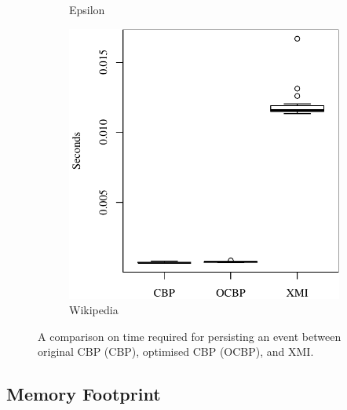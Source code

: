\documentclass{llncs}
\begin{document}
\begin{figure}[t]
\begin{subfigure}{0.325\textwidth}
            \caption{Epsilon}
            \label{fig:save_time_epsilon}
        \end{subfigure}
        \hfill
        \begin{subfigure}{0.325\textwidth}
            \centering
            \includegraphics[width=\linewidth]{images/save_time_wikipedia}
            \caption{Wikipedia}
            \label{fig:save_time_wikipedia}
        \end{subfigure}
        \caption{A comparison on time required for persisting an event between original CBP (CBP), optimised CBP (OCBP), and XMI.}
        \label{fig:savetime}
    \end{figure}
    
    
    \vspace{-10pt}
    \subsection{Memory Footprint}
    \label{subsec:memory_consumption}
    
\end{document}

